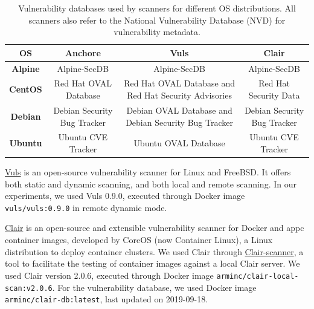 \documentclass[a4paper,num-refs]{oup-contemporary}
\begin{document}
\begin{table}
\begin{tabular}{|c|c|c|c|}
 \hline
\textbf{OS} &	\textbf{Anchore} &	\textbf{Vuls} &	\textbf{Clair} \\
\hline
	\textbf{Alpine} & Alpine-SecDB &	Alpine-SecDB &	Alpine-SecDB \\
\hline
	\textbf{CentOS} & Red Hat OVAL Database & Red Hat OVAL Database and Red Hat Security Advisories & Red Hat Security Data \\
\hline
	\textbf{Debian} & Debian Security Bug Tracker &	Debian OVAL Database and Debian Security Bug Tracker & Debian Security Bug Tracker \\
\hline
	\textbf{Ubuntu} & Ubuntu CVE Tracker &	Ubuntu OVAL Database &	Ubuntu CVE Tracker \\
 \hline
\end{tabular}
\caption{Vulnerability databases used by scanners for different OS distributions. All scanners also refer to 
the National Vulnerability Database (NVD) for vulnerability metadata.}
\label{table:databases}
\end{table}

\href{https://github.com/future-architect/vuls}{Vuls} is an open-source vulnerability scanner for Linux and FreeBSD. It
offers both static and dynamic scanning, and both local and remote
scanning. In our experiments, we used Vuls 0.9.0, executed through Docker image
\texttt{vuls/vuls:0.9.0} in remote dynamic mode.

\href{https://github.com/quay/clair}{Clair} is an open-source and
extensible vulnerability scanner for Docker and appc container images,
developed by CoreOS (now Container Linux), a Linux distribution to deploy
container clusters.
 We used Clair through
\href{https://github.com/arminc/clair-scanner}{Clair-scanner}, a tool to
facilitate the testing of container images against a local Clair server. 
We used Clair version 2.0.6, executed through
Docker image \texttt{arminc/clair-local-scan:v2.0.6}. For the vulnerability
database, we used Docker image \texttt{arminc/clair-db:latest}, last
updated on 2019-09-18.
\end{document}
